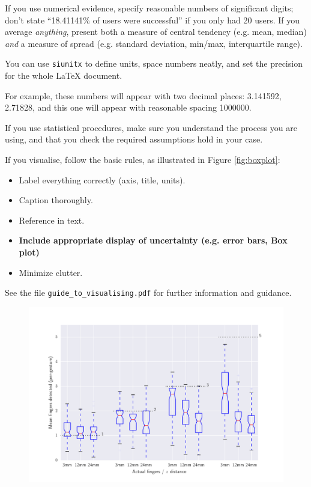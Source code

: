 \documentclass{l4proj}
\begin{document}
{If you use numerical evidence, specify reasonable numbers of significant digits; don't state ``18.41141\% of users were successful'' if you only had 20 users. If you average \textit{anything}, present both a measure of central tendency (e.g. mean, median) \textit{and} a measure of spread (e.g. standard deviation, min/max, interquartile range).

You can use \texttt{siunitx} to define units, space numbers neatly, and set the precision for the whole LaTeX document. 


For example, these numbers will appear with two decimal places: \num{3.141592}, \num{2.71828}, and this one will appear with reasonable spacing \num{1000000}.



If you use statistical procedures, make sure you understand the process you are using,
and that you check the required assumptions hold in your case. 

If you visualise, follow the basic rules, as illustrated in Figure \ref{fig:boxplot}:
\begin{itemize}
\item Label everything correctly (axis, title, units).
\item Caption thoroughly.
\item Reference in text.
\item \textbf{Include appropriate display of uncertainty (e.g. error bars, Box plot)}
\item Minimize clutter.
\end{itemize}

See the file \texttt{guide\_to\_visualising.pdf} for further information and guidance.

\begin{figure}[htb]
    \centering
    \includegraphics[width=1.0\linewidth]{images/boxplot_finger_distance.pdf}    


\end{figure}}
\end{document}
